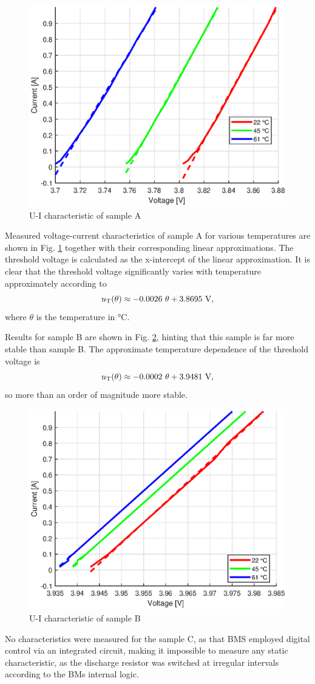\begin{figure}[htbp]
    \centering
    \includegraphics[width=0.5\linewidth]{figures/2/sample_A.eps}
    \caption{U-I characteristic of sample A}
    \label{fig:2-sample-A}
\end{figure}

Measured voltage-current characteristics of sample A for various temperatures are shown in Fig. \ref{fig:2-sample-A} together with their corresponding linear approximations. The threshold voltage is calculated as the x-intercept of the linear approximation. It is clear that the threshold voltage significantly varies with temperature approximately according to
\begin{equation}
    u_{\rm T} (\theta) \approx -0.0026~\theta + 3.8695 \text{ V},
\end{equation}
where $\theta$ is the temperature in °C.

Results for sample B are shown in Fig. \ref{fig:2-sample-B}, hinting that this sample is far more stable than sample B. The approximate temperature dependence of the threshold voltage is
\begin{equation}
    u_{\rm T} (\theta) \approx -0.0002~\theta + 3.9481 \text{ V},
\end{equation}
so more than an order of magnitude more stable.

\begin{figure}[htbp]
    \centering
    \includegraphics[width=0.5\linewidth]{figures/2/sample_B.eps}
    \caption{U-I characteristic of sample B}
    \label{fig:2-sample-B}
\end{figure}

No characteristics were measured for the sample C, as that BMS employed digital control via an integrated circuit, making it impossible to measure any static characteristic, as the discharge resistor was switched at irregular intervals according to the BMs internal logic.

